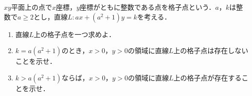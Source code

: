 $xy$平面上の点で$x$座標，$y$座標がともに整数である点を格子点という．$a$，$k$は整数で$a\ge 2$とし，直線$L: ax+(a^2+1)y=k$を考える．
\begin{enumerate}
  \item 直線$L$上の格子点を一つ求めよ．
  \item $k=a(a^2+1)$のとき，$x>0$，$y>0$の領域に直線$L$上の格子点は存在しないことを示せ．
  \item $k>a(a^2+1)$ならば，$x>0$，$y>0$の領域に直線$L$上の格子点が存在することを示せ．
\end{enumerate}